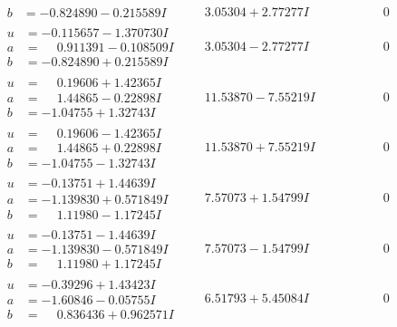 \documentclass[1p]{elsarticle_modified}
\theoremstyle{definition}
\begin{document}
$$\begin{array}{c|c|c}
\begin{aligned}
b &= -0.824890 - 0.215589 I\end{aligned}
 & \phantom{-}3.05304 + 2.77277 I & \phantom{-0.000000 } 0 \\ \hline\begin{aligned}
u &= -0.115657 - 1.370730 I \\
a &= \phantom{-}0.911391 - 0.108509 I \\
b &= -0.824890 + 0.215589 I\end{aligned}
 & \phantom{-}3.05304 - 2.77277 I & \phantom{-0.000000 } 0 \\ \hline\begin{aligned}
u &= \phantom{-}0.19606 + 1.42365 I \\
a &= \phantom{-}1.44865 - 0.22898 I \\
b &= -1.04755 + 1.32743 I\end{aligned}
 & \phantom{-}11.53870 - 7.55219 I & \phantom{-0.000000 } 0 \\ \hline\begin{aligned}
u &= \phantom{-}0.19606 - 1.42365 I \\
a &= \phantom{-}1.44865 + 0.22898 I \\
b &= -1.04755 - 1.32743 I\end{aligned}
 & \phantom{-}11.53870 + 7.55219 I & \phantom{-0.000000 } 0 \\ \hline\begin{aligned}
u &= -0.13751 + 1.44639 I \\
a &= -1.139830 + 0.571849 I \\
b &= \phantom{-}1.11980 - 1.17245 I\end{aligned}
 & \phantom{-}7.57073 + 1.54799 I & \phantom{-0.000000 } 0 \\ \hline\begin{aligned}
u &= -0.13751 - 1.44639 I \\
a &= -1.139830 - 0.571849 I \\
b &= \phantom{-}1.11980 + 1.17245 I\end{aligned}
 & \phantom{-}7.57073 - 1.54799 I & \phantom{-0.000000 } 0 \\ \hline\begin{aligned}
u &= -0.39296 + 1.43423 I \\
a &= -1.60846 - 0.05755 I \\
b &= \phantom{-}0.836436 + 0.962571 I\end{aligned}
 & \phantom{-}6.51793 + 5.45084 I & \phantom{-0.000000 } 0 \\ \hline\begin{aligned}

\end{aligned}
\end{array}$$
\end{document}
